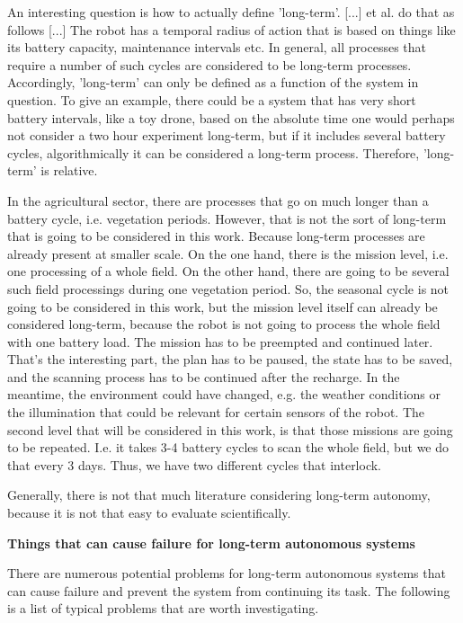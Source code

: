 \documentclass[german, master, expose, latin1]{base/thesis_KBS}
\begin{document}
An interesting question is how to actually define 'long-term'. [...] et al. do that as follows [...] The robot has a temporal radius of action that is based
on things like its battery capacity, maintenance intervals etc. In general, all processes that require a number of such cycles are considered to be long-term processes.
Accordingly, 'long-term' can only be defined as a function of the system in question. To give an example, there could be a system that has very short battery intervals,
like a toy drone, based on the absolute time one would perhaps not consider a two hour experiment long-term, but if it includes several battery cycles, algorithmically
it can be considered a long-term process. Therefore, 'long-term' is relative.\newline

In the agricultural sector, there are processes that go on much longer than a battery cycle, i.e. vegetation periods.
However, that is not the sort of long-term that is going to be considered in this work. Because long-term processes are already present at smaller scale.
On the one hand, there is the mission level, i.e. one processing of a whole field. On the other hand, there are going to be several such field processings during one vegetation
period. So, the seasonal cycle is not going to be considered in this work, but the mission level itself can already be considered long-term, because the robot is not
going to process the whole field with one battery load. The mission has to be preempted and continued later. That's the interesting part, the plan has to be paused,
the state has to be saved, and the scanning process has to be continued after the recharge. In the meantime, the environment could have changed, e.g. the weather conditions
or the illumination that could be relevant for certain sensors of the robot. The second level that will be considered in this work, is that those missions are going
to be repeated. I.e. it takes 3-4 battery cycles to scan the whole field, but we do that every 3 days. Thus, we have two different cycles that interlock.\newline

Generally, there is not that much literature considering long-term autonomy, because it is not that easy to evaluate scientifically.\newline

\textbf{Things that can cause failure for long-term autonomous systems}\newline

There are numerous potential problems for long-term autonomous systems that can cause failure and prevent the system from continuing its task.
The following is a list of typical problems that are worth investigating.
\end{document}
